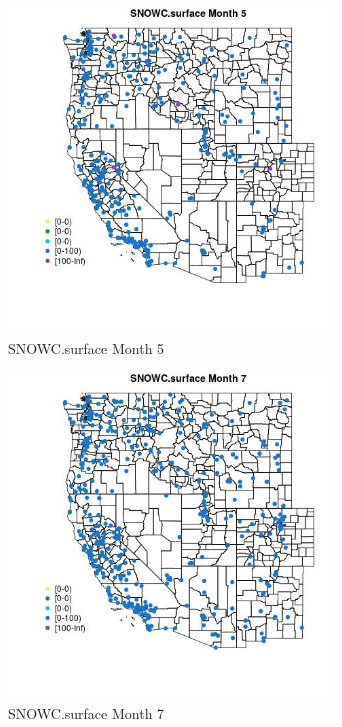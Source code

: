 \begin{figure} 
\centering  
\includegraphics[width=0.77\textwidth]{Code_Outputs/Report_ML_input_PM25_Step4_part_e_de_duplicated_aves_compiled_2019-05-18wNAs_MapObsMo5SNOWCsurface.jpg} 
\caption{\label{fig:Report_ML_input_PM25_Step4_part_e_de_duplicated_aves_compiled_2019-05-18wNAsMapObsMo5SNOWCsurface}SNOWC.surface Month 5} 
\end{figure} 
 

\begin{figure} 
\centering  
\includegraphics[width=0.77\textwidth]{Code_Outputs/Report_ML_input_PM25_Step4_part_e_de_duplicated_aves_compiled_2019-05-18wNAs_MapObsMo7SNOWCsurface.jpg} 
\caption{\label{fig:Report_ML_input_PM25_Step4_part_e_de_duplicated_aves_compiled_2019-05-18wNAsMapObsMo7SNOWCsurface}SNOWC.surface Month 7} 
\end{figure} 
 

